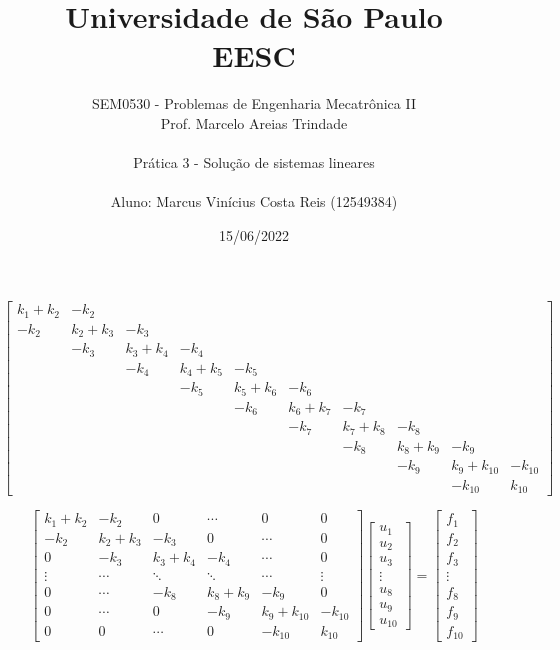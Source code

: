 \documentclass[a4paper, 12pt]{article}
\title{Universidade de São Paulo \\ EESC}
\author{SEM0530 - Problemas de Engenharia Mecatrônica II \\ 
Prof. Marcelo Areias Trindade \\ \\ Prática 3 - Solução de sistemas lineares
\\ \\ Aluno: Marcus Vinícius Costa Reis (12549384)}
\date{15/06/2022}
\begin{document}
	\maketitle \newpage
	
	$$\begin{bmatrix}
		k_1+k_2 & -k_2 & & & & & & & & \\ -k_2 & k_2+k_3 & -k_3 & & & & & & & \\ & -k_3 & k_3+k_4 & -k_4 & & & & & & \\
		& & -k_4 & k_4+k_5 & -k_5 & & & & & \\ & & & -k_5 & k_5+k_6 & -k_6 & & & & \\ & & & & -k_6 & k_6+k_7 & -k_7 & & & \\
		& & & & & -k_7 & k_7+k_8 & -k_8 & & \\ & & & & & & -k_8 & k_8+k_9 & -k_9 & \\ & & & & & & & -k_9 & k_9+k_{10} & 
		-k_{10} \\ & & & & & & & & -k_{10} & k_{10}
	\end{bmatrix}$$
		
	$$\begin{bmatrix}
		k_1+k_2 & -k_2 & 0 & \cdots & 0 & 0 \\ -k_2 & k_2+k_3 & -k_3 & 0 & \cdots & 0 \\ 0 & -k_3 & k_3+k_4 & -k_4 
		& \cdots & 0 \\ \vdots & \cdots & \ddots & \ddots & \cdots & \vdots \\ 0 & \cdots & -k_8 & k_8+k_9 & -k_9 & 0 
		\\ 0 & \cdots & 0 & -k_9 & k_9+k_{10} & -k_{10}	\\ 0 & 0 & \cdots & 0 & -k_{10} & k_{10}
	\end{bmatrix} \begin{bmatrix} u_1 \\ u_2 \\ u_3 \\ \vdots \\ u_8 \\ u_9 \\ u_{10} \end{bmatrix}
	=\begin{bmatrix} f_1 \\ f_2 \\ f_3 \\ \vdots \\ f_8 \\ f_9 \\ f_{10}	\end{bmatrix}$$	
	
\end{document}
